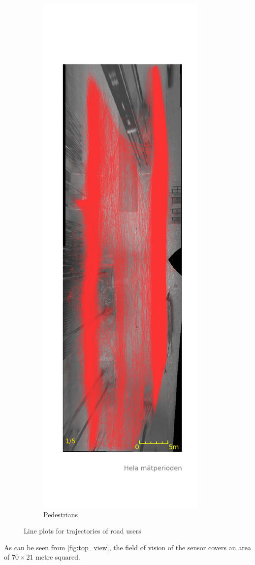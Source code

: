 \documentclass{article}
\begin{document}
\begin{figure}[H]
\begin{subfigure}{.3\textwidth}
  \includegraphics[width=.5\linewidth]{data/Data_4.png}
  \caption{Pedestrians}
  \label{fig:ped_shu}
\end{subfigure}
\caption{Line plots for trajectories of road users}
\label{fig:trajectories}
\end{figure}

As can be seen from \ref{fig:top_view}, the field of vision of the sensor covers an area of $70 \times 21$ metre squared. 
\end{document}
